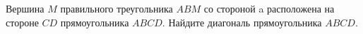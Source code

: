 \begin{ex}
	\begin{condition}
		Вершина \( M  \) правильного треугольника \( ABM  \) со стороной a расположена на стороне \( CD  \) прямоугольника \( ABCD \). Найдите диагональ прямоугольника \( ABCD \).
	\end{condition}
\end{ex}